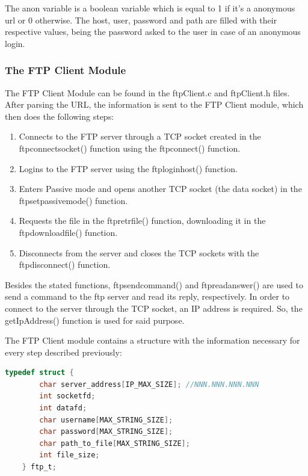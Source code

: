 \documentclass[11pt,a4paper,reqno]{article}
\numberwithin{equation}{section}
\begin{document}
	The anon variable is a boolean variable which is equal to 1 if it’s a anonymous url or 0 otherwise. The host, user, password and path are filled with their respective values, being the password asked to the user in case of an anonymous login.

	\subsubsection{The FTP Client Module}

	The FTP Client Module can be found in the ftpClient.c and ftpClient.h files. After parsing the URL, the information is sent to the FTP Client module, which then does the following steps:

	\begin{enumerate}
		\item Connects to the FTP server through a TCP socket created in the ftp\textunderscore connect\textunderscore socket() function using the ftp\textunderscore connect() function.
		\item Logins to the FTP server using the ftp\textunderscore login\textunderscore host() function.
		\item Enters Passive mode and opens another TCP socket (the data socket) in the ftp\textunderscore set\textunderscore passive\textunderscore mode() function.
		\item Requests the file in the ftp\textunderscore retr\textunderscore file() function, downloading it in the ftp\textunderscore download\textunderscore file() function.
		\item Disconnects from the server and closes the TCP sockets with the ftp\textunderscore disconnect() function.
	\end{enumerate}

	
		Besides the stated functions, ftp\textunderscore send\textunderscore command() and ftp\textunderscore read\textunderscore answer() are used to send a command to the ftp server and read its reply, respectively. In order to connect to the server through the TCP socket, an IP address is required. So, the getIpAddress() function is used for said purpose.

	The FTP Client module contains a structure with the information necessary for every step described previously:

	\begin{lstlisting}[language=C, breaklines=true]
	typedef struct {
		char server_address[IP_MAX_SIZE]; //NNN.NNN.NNN.NNN
		int socketfd;
		int datafd;
		char username[MAX_STRING_SIZE];
		char password[MAX_STRING_SIZE];
		char path_to_file[MAX_STRING_SIZE];
		int file_size;
	} ftp_t;
	\end{lstlisting}
\end{document}
